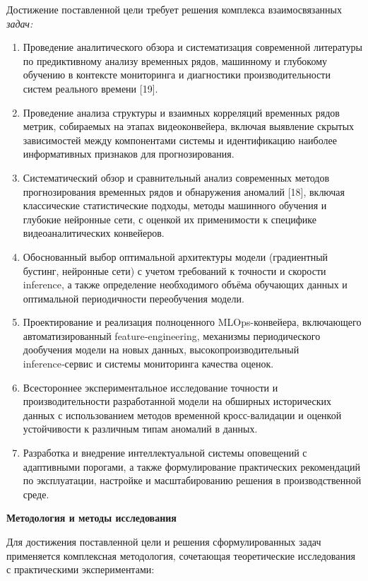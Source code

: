 Достижение поставленной цели требует решения комплекса взаимосвязанных \textit{задач:}

\begin{enumerate}
	\item Проведение аналитического обзора и систематизация современной литературы по предиктивному анализу временных рядов, машинному и глубокому обучению в контексте мониторинга и диагностики производительности систем реального времени [19].
	\item Проведение анализа структуры и взаимных корреляций временных рядов метрик, собираемых на этапах видеоконвейера, включая выявление скрытых зависимостей между компонентами системы и идентификацию наиболее информативных признаков для прогнозирования.
	\item Систематический обзор и сравнительный анализ современных методов прогнозирования временных рядов и обнаружения аномалий [18], включая классические статистические подходы, методы машинного обучения и глубокие нейронные сети, с оценкой их применимости к специфике видеоаналитических конвейеров.
	\item Обоснованный выбор оптимальной архитектуры модели (градиентный бустинг, нейронные сети) с учетом требований к точности и скорости inference, а также определение необходимого объёма обучающих данных и оптимальной периодичности переобучения модели.
	\item Проектирование и реализация полноценного MLOps-конвейера, включающего автоматизированный feature‑engineering, механизмы периодического дообучения модели на новых данных, высокопроизводительный inference‑сервис и системы мониторинга качества оценок.
	\item Всестороннее экспериментальное исследование точности и производительности разработанной модели на обширных исторических данных с использованием методов временной кросс-валидации и оценкой устойчивости к различным типам аномалий в данных.
	\item Разработка и внедрение интеллектуальной системы оповещений с адаптивными порогами, а также формулирование практических рекомендаций по эксплуатации, настройке и масштабированию решения в производственной среде.
\end{enumerate}

\textbf{Методология и методы исследования}

Для достижения поставленной цели и решения сформулированных задач применяется комплексная методология, сочетающая теоретические исследования с практическими экспериментами:

